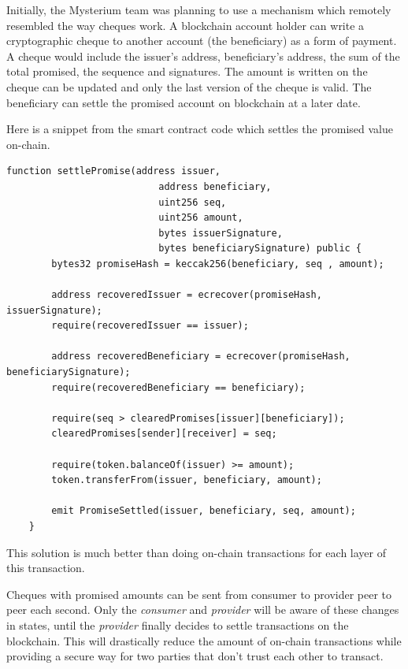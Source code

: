 \documentclass[a4paper,12pt]{article}
\begin{document}
Initially, the Mysterium team was planning to use a mechanism which remotely 
resembled the way cheques work. A blockchain account holder can write a 
cryptographic cheque to another account (the beneficiary) as a form of payment. 
A cheque would include the issuer’s address, beneficiary’s address, the sum of 
the total promised, the sequence and signatures. The amount is written on the 
cheque can be updated and only the last version of the cheque is valid. The 
beneficiary can settle the promised account on blockchain at a later date.

Here is a snippet from the smart contract code which settles the promised value 
on-chain.

\begin{lstlisting}[language=Solidity]
    function settlePromise(address issuer, 
                           address beneficiary, 
                           uint256 seq, 
                           uint256 amount, 
                           bytes issuerSignature,
                           bytes beneficiarySignature) public {
        bytes32 promiseHash = keccak256(beneficiary, seq , amount);

        address recoveredIssuer = ecrecover(promiseHash, issuerSignature);
        require(recoveredIssuer == issuer);

        address recoveredBeneficiary = ecrecover(promiseHash, beneficiarySignature);
        require(recoveredBeneficiary == beneficiary);

        require(seq > clearedPromises[issuer][beneficiary]);
        clearedPromises[sender][receiver] = seq;

        require(token.balanceOf(issuer) >= amount);
        token.transferFrom(issuer, beneficiary, amount);

        emit PromiseSettled(issuer, beneficiary, seq, amount);
    }
\end{lstlisting}

This solution is much better than doing on-chain transactions for each layer of 
this transaction. 

Cheques with promised amounts can be sent from consumer to provider peer to peer 
each second. Only the \textit{consumer} and \textit{provider} will be aware of 
these changes in states, until the \textit{provider} finally decides to settle 
transactions on the blockchain. This will drastically reduce the amount of 
on-chain transactions while providing a secure way for two parties that don’t 
trust each other to transact. 
\end{document}
